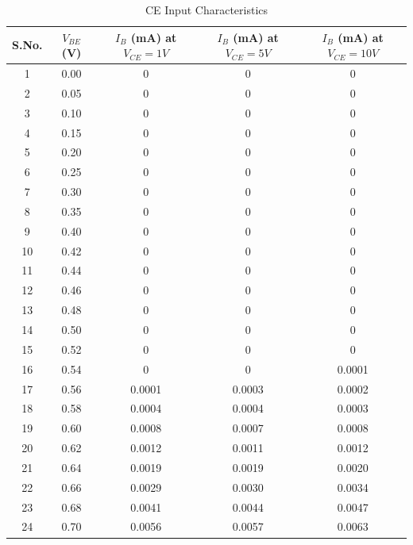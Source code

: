\documentclass[12pt,a4paper]{article}
\begin{document}
\begin{table}[H]
    \centering
    \caption{CE Input Characteristics}
    \begin{tabular}{|c|c|c|c|c|}
        \hline
        \textbf{S.No.} & \textbf{$V_{BE}$ (V)} & \textbf{$I_B$ (mA) at $V_{CE}=1 V$} & \textbf{$I_B$ (mA) at $V_{CE}=5 V$} & \textbf{$I_B$ (mA) at $V_{CE}=10 V$} \\
        \hline
        1  & 0.00 & 0      & 0      & 0      \\ \hline
        2  & 0.05 & 0      & 0      & 0      \\ \hline
        3  & 0.10 & 0      & 0      & 0      \\ \hline
        4  & 0.15 & 0      & 0      & 0      \\ \hline
        5  & 0.20 & 0      & 0      & 0      \\ \hline
        6  & 0.25 & 0      & 0      & 0      \\ \hline
        7  & 0.30 & 0      & 0      & 0      \\ \hline
        8  & 0.35 & 0      & 0      & 0      \\ \hline
        9  & 0.40 & 0      & 0      & 0      \\ \hline
        10 & 0.42 & 0      & 0      & 0      \\ \hline
        11 & 0.44 & 0      & 0      & 0      \\ \hline
        12 & 0.46 & 0      & 0      & 0      \\ \hline
        13 & 0.48 & 0      & 0      & 0      \\ \hline
        14 & 0.50 & 0      & 0      & 0      \\ \hline
        15 & 0.52 & 0      & 0      & 0      \\ \hline
        16 & 0.54 & 0      & 0      & 0.0001 \\ \hline
        17 & 0.56 & 0.0001 & 0.0003 & 0.0002 \\ \hline
        18 & 0.58 & 0.0004 & 0.0004 & 0.0003 \\ \hline
        19 & 0.60 & 0.0008 & 0.0007 & 0.0008 \\ \hline
        20 & 0.62 & 0.0012 & 0.0011 & 0.0012 \\ \hline
        21 & 0.64 & 0.0019 & 0.0019 & 0.0020 \\ \hline
        22 & 0.66 & 0.0029 & 0.0030 & 0.0034 \\ \hline
        23 & 0.68 & 0.0041 & 0.0044 & 0.0047 \\ \hline
        24 & 0.70 & 0.0056 & 0.0057 & 0.0063 \\ \hline
    \end{tabular}
\end{table}
\end{document}
